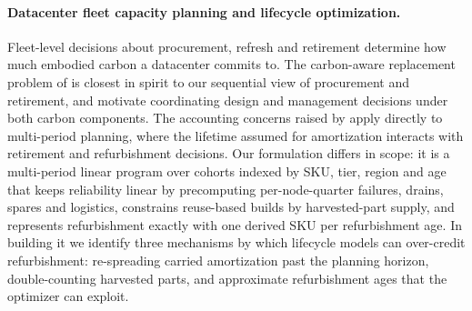 \documentclass{article} %
\begin{document}
\paragraph{Datacenter fleet capacity planning and lifecycle optimization.}
Fleet-level decisions about procurement, refresh and retirement determine how much embodied carbon a datacenter commits to. The carbon-aware replacement problem of \citet{Sharma2025TowardOptimal} is closest in spirit to our sequential view of procurement and retirement, and \citet{Acun2023CarbonDependencies} motivate coordinating design and management decisions under both carbon components. The accounting concerns raised by \citet{Huang2025CaseAccurate} apply directly to multi-period planning, where the lifetime assumed for amortization interacts with retirement and refurbishment decisions. Our formulation differs in scope: it is a multi-period linear program over cohorts indexed by SKU, tier, region and age that keeps reliability linear by precomputing per-node-quarter failures, drains, spares and logistics, constrains reuse-based builds by harvested-part supply, and represents refurbishment exactly with one derived SKU per refurbishment age. In building it we identify three mechanisms by which lifecycle models can over-credit refurbishment: re-spreading carried amortization past the planning horizon, double-counting harvested parts, and approximate refurbishment ages that the optimizer can exploit.
\end{document}
